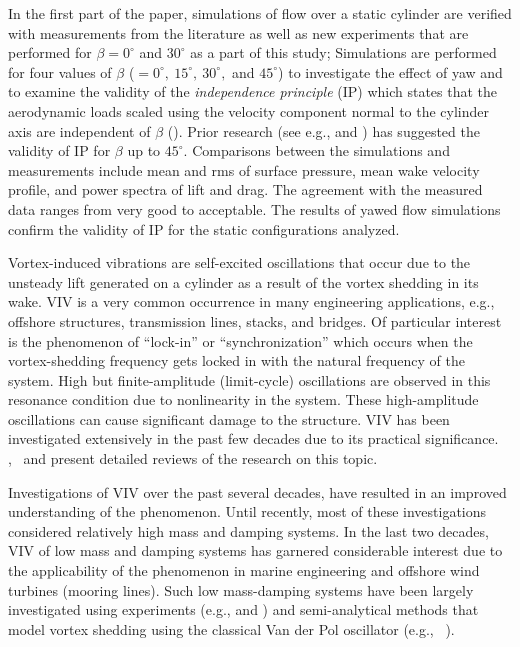 In the first part of the paper, simulations of flow over a static cylinder are
verified with measurements from the literature as well as new experiments that
are performed for $\beta=0^\circ$ and $30^\circ$ as a part of this study;
Simulations are performed for four values of $\beta$
($=0^\circ,~15^\circ,~30^\circ,$ and $45^\circ$) to investigate the effect of
yaw and to examine the validity of the {\em independence principle} (IP) which
states that the aerodynamic loads scaled using the velocity component normal to
the cylinder axis are independent of $\beta$ (\citet{zdravkovich2003flow}).
Prior research (see e.g., \citet{franzini2009experimental} and
\citet{zhao2009direct}) has suggested the validity of IP for $\beta$ up to
$45^\circ$. Comparisons between the simulations and measurements include mean
and rms of surface pressure, mean wake velocity profile, and power spectra of
lift and drag. The agreement with the measured data ranges from very good to
acceptable. The results of yawed flow simulations confirm the validity of IP
for the static configurations analyzed.

Vortex-induced vibrations are self-excited oscillations that occur due to the
unsteady lift generated on a cylinder as a result of the vortex shedding in its
wake. VIV is a very common occurrence in many engineering applications, e.g.,
offshore structures, transmission lines, stacks, and bridges. Of particular
interest is the phenomenon of ``lock-in'' or ``synchronization'' which occurs
when the vortex-shedding frequency gets locked in with the natural frequency of
the system. High but finite-amplitude (limit-cycle) oscillations are observed
in this resonance condition due to nonlinearity in the system. These
high-amplitude oscillations can cause significant damage to the structure. VIV
has been investigated extensively in the past few decades due to its practical
significance. \cite{bearman1984vortex},~\cite{sarpkaya2004critical} and
\cite{williamson2004vortex} present detailed reviews of the research on this
topic.

Investigations of VIV over the past several decades, have resulted in an
improved understanding of the phenomenon. Until recently, most of these
investigations considered relatively high mass and damping systems. In the last
two decades, VIV of low mass and damping systems has garnered considerable
interest due to the applicability of the phenomenon in marine engineering and
offshore wind turbines (mooring lines). Such low mass-damping systems have been
largely investigated using experiments (e.g., \citet{jain2013vortex} and
\citet{franzini2013one}) and semi-analytical methods that model vortex shedding
using the classical Van der Pol oscillator (e.g., ~\cite{xu2008high}). 

